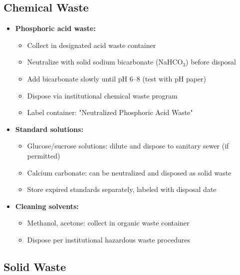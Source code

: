 \documentclass[11pt,a4paper]{article}\usepackage[]{graphicx}\usepackage[]{xcolor}
\begin{document}
\subsection{Chemical Waste}

\begin{itemize}[noitemsep]
    \item \textbf{Phosphoric acid waste:}
    \begin{itemize}
        \item Collect in designated acid waste container
        \item Neutralize with solid sodium bicarbonate (NaHCO$_3$) before disposal
        \item Add bicarbonate slowly until pH 6--8 (test with pH paper)
        \item Dispose via institutional chemical waste program
        \item Label container: "Neutralized Phosphoric Acid Waste"
    \end{itemize}
    \item \textbf{Standard solutions:}
    \begin{itemize}
        \item Glucose/sucrose solutions: dilute and dispose to sanitary sewer (if permitted)
        \item Calcium carbonate: can be neutralized and disposed as solid waste
        \item Store expired standards separately, labeled with disposal date
    \end{itemize}
    \item \textbf{Cleaning solvents:}
    \begin{itemize}
        \item Methanol, acetone: collect in organic waste container
        \item Dispose per institutional hazardous waste procedures
    \end{itemize}
\end{itemize}

\subsection{Solid Waste}
\end{document}
